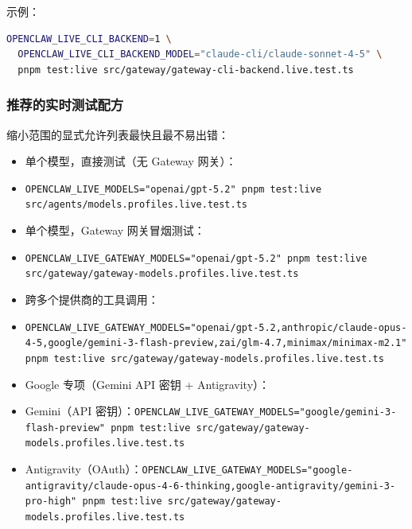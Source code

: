 示例：

\begin{lstlisting}[language=bash]
OPENCLAW_LIVE_CLI_BACKEND=1 \
  OPENCLAW_LIVE_CLI_BACKEND_MODEL="claude-cli/claude-sonnet-4-5" \
  pnpm test:live src/gateway/gateway-cli-backend.live.test.ts
\end{lstlisting}


\subsubsection{推荐的实时测试配方}


缩小范围的显式允许列表最快且最不易出错：

\begin{itemize}
  \item 单个模型，直接测试（无 Gateway 网关）：
  \item \texttt{OPENCLAW\_LIVE\_MODELS="openai/gpt-5.2" pnpm test:live src/agents/models.profiles.live.test.ts}
\end{itemize}


\begin{itemize}
  \item 单个模型，Gateway 网关冒烟测试：
  \item \texttt{OPENCLAW\_LIVE\_GATEWAY\_MODELS="openai/gpt-5.2" pnpm test:live src/gateway/gateway-models.profiles.live.test.ts}
\end{itemize}


\begin{itemize}
  \item 跨多个提供商的工具调用：
  \item \texttt{OPENCLAW\_LIVE\_GATEWAY\_MODELS="openai/gpt-5.2,anthropic/claude-opus-4-5,google/gemini-3-flash-preview,zai/glm-4.7,minimax/minimax-m2.1" pnpm test:live src/gateway/gateway-models.profiles.live.test.ts}
\end{itemize}


\begin{itemize}
  \item Google 专项（Gemini API 密钥 + Antigravity）：
  \item Gemini（API 密钥）：\texttt{OPENCLAW\_LIVE\_GATEWAY\_MODELS="google/gemini-3-flash-preview" pnpm test:live src/gateway/gateway-models.profiles.live.test.ts}
  \item Antigravity（OAuth）：\texttt{OPENCLAW\_LIVE\_GATEWAY\_MODELS="google-antigravity/claude-opus-4-6-thinking,google-antigravity/gemini-3-pro-high" pnpm test:live src/gateway/gateway-models.profiles.live.test.ts}
\end{itemize}


